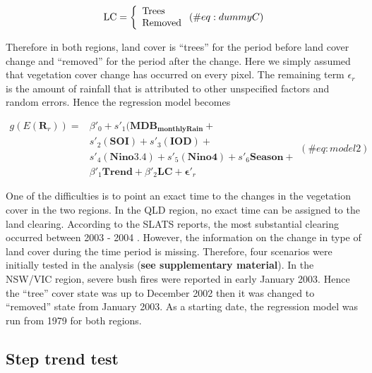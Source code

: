 \documentclass[fleqn,10pt,lineno]{wlpeerj} %
\begin{document}
\begin{equation}
  \mbox{LC} = \left\{
  \begin{array}{ll}
     \mbox{Trees} \\
     \mbox{Removed}
  \end{array} \right.\\
  (\#eq:dummyC)
\end{equation}

Therefore in both regions, land cover is ``trees'' for the period before
land cover change and ``removed'' for the period after the change. Here
we simply assumed that vegetation cover change has occurred on every
pixel. The remaining term \(\epsilon_r\) is the amount of rainfall that
is attributed to other unspecified factors and random errors. Hence the
regression model becomes \vspace{0.5cm}

\begin{equation}
\begin{array}{lll}
g(E(\mathbf{R}_r)) = &\beta'_0 + s'_1(\mathbf{MDB_{monthlyRain}} + \\
  &s'_2(\mathbf{SOI}) + s'_3(\mathbf{IOD}) + \\
  &s'_4(\mathbf{Nino3.4}) + s'_5(\mathbf{Nino4}) + s'_6\mathbf{Season} + \\
  &\beta'_1\mathbf{Trend} + \beta'_2\mathbf{LC} + \boldsymbol{\epsilon'}_r
\end{array}
  (\#eq:model2)
\end{equation}

One of the difficulties is to point an exact time to the changes in the
vegetation cover in the two regions. In the QLD region, no exact time
can be assigned to the land clearing. According to the SLATS reports,
the most substantial clearing occurred between 2003 - 2004 . However,
the information on the change in type of land cover during the time
period is missing. Therefore, four scenarios were initially tested in
the analysis (\textbf{see supplementary material}). In the NSW/VIC
region, severe bush fires were reported in early January 2003. Hence the
``tree'' cover state was up to December 2002 then it was changed to
``removed'' state from January 2003. As a starting date, the regression
model was run from 1979 for both regions.

\subsection{Step trend test}\label{step-trend-test}
\end{document}
